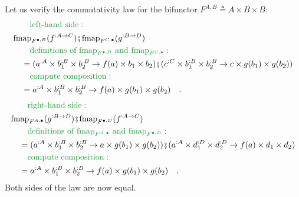 Let us verify the commutativity law for the bifunctor
$F^{A,B}\triangleq A\times B\times B$:
\begin{align*}
 & \quad{\color{greenunder}\quad\text{left-hand side}:}\quad\\
 & \text{fmap}_{F^{\bullet,B}}(f^{:A\rightarrow C})\bef\text{fmap}_{F^{C,\bullet}}(g^{:B\rightarrow D})\\
 & \quad{\color{greenunder}\quad\text{definitions of }\text{fmap}_{F^{\bullet,B}}\text{ and }\text{fmap}_{F^{C,\bullet}}:}\quad\\
 & \quad=(a^{:A}\times b_{1}^{:B}\times b_{2}^{:B}\rightarrow f(a)\times b_{1}\times b_{2})\bef(c^{:C}\times b_{1}^{:B}\times b_{2}^{:B}\rightarrow c\times g(b_{1})\times g(b_{2}))\\
 & \quad{\color{greenunder}\quad\text{compute composition}:}\quad\\
 & \quad=a^{:A}\times b_{1}^{:B}\times b_{2}^{:B}\rightarrow f(a)\times g(b_{1})\times g(b_{2})\quad.
\end{align*}
\begin{align*}
 & \quad{\color{greenunder}\quad\text{right-hand side}:}\quad\\
 & \text{fmap}_{F^{A,\bullet}}(g^{:B\rightarrow D})\bef\text{fmap}_{F^{\bullet,D}}(f^{:A\rightarrow C})\\
 & \quad{\color{greenunder}\quad\text{definitions of }\text{fmap}_{F^{A,\bullet}}\text{ and }\text{fmap}_{F^{\bullet,D}}:}\quad\\
 & \quad=(a^{:A}\times b_{1}^{:B}\times b_{2}^{:B}\rightarrow a\times g(b_{1})\times g(b_{2}))\bef(a^{:A}\times d_{1}^{:D}\times d_{2}^{:D}\rightarrow f(a)\times d_{1}\times d_{2})\\
 & \quad{\color{greenunder}\quad\text{compute composition}:}\quad\\
 & \quad=a^{:A}\times b_{1}^{:B}\times b_{2}^{:B}\rightarrow f(a)\times g(b_{1})\times g(b_{2})\quad.
\end{align*}
Both sides of the law are now equal.

